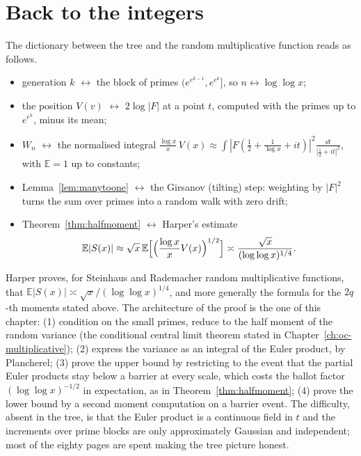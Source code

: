 \section{Back to the integers}

The dictionary between the tree and the random multiplicative function reads as follows.
\begin{itemize}
\item generation $k$ $\leftrightarrow$ the block of primes $(e^{e^{k-1}},e^{e^k}]$, so $n\leftrightarrow\log\log x$;
\item the position $V(v)$ $\leftrightarrow$ $2\log|F|$ at a point $t$, computed with the primes up to $e^{e^k}$, minus its mean;
\item $W_n$ $\leftrightarrow$ the normalised integral $\frac{\log x}x\,V(x)\approx\int|F(\frac12+\frac1{\log x}+it)|^2\frac{\dd t}{|\frac12+it|^2}$, with $\mathbb E=1$ up to constants;
\item Lemma~\ref{lem:manytoone} $\leftrightarrow$ the Girsanov (tilting) step: weighting by $|F|^2$ turns the sum over primes into a random walk with zero drift;
\item Theorem~\ref{thm:halfmoment} $\leftrightarrow$ Harper's estimate
\[
\mathbb E|S(x)|\approx\sqrt x\,\mathbb E\Bigl[\Bigl(\frac{\log x}xV(x)\Bigr)^{1/2}\Bigr]\asymp\frac{\sqrt x}{(\log\log x)^{1/4}}.
\]
\end{itemize}

\begin{remark}\label{rem:harper2020}
Harper proves, for Steinhaus and Rademacher random multiplicative functions, that $\mathbb E|S(x)|\asymp\sqrt x/(\log\log x)^{1/4}$, and more generally the formula for the $2q$-th moments stated above. The architecture of the proof is the one of this chapter: (1) condition on the small primes, reduce to the half moment of the random variance (the conditional central limit theorem stated in Chapter~\ref{ch:oc-multiplicative}); (2) express the variance as an integral of the Euler product, by Plancherel; (3) prove the upper bound by restricting to the event that the partial Euler products stay below a barrier at every scale, which costs the ballot factor $(\log\log x)^{-1/2}$ in expectation, as in Theorem~\ref{thm:halfmoment}; (4) prove the lower bound by a second moment computation on a barrier event. The difficulty, absent in the tree, is that the Euler product is a continuous field in $t$ and the increments over prime blocks are only approximately Gaussian and independent; most of the eighty pages are spent making the tree picture honest.
\end{remark}

